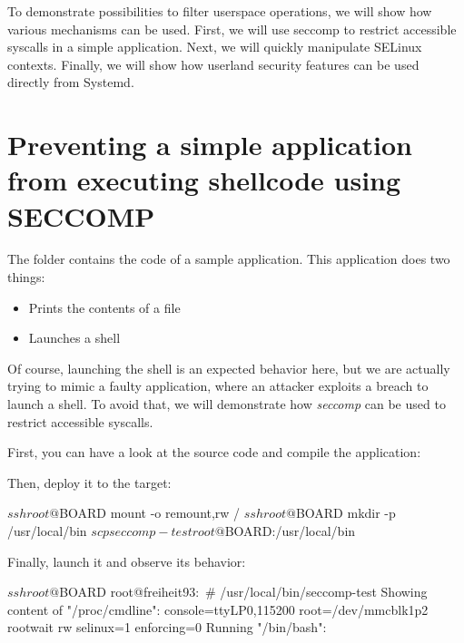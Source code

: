 
To demonstrate possibilities to filter userspace operations, we will show how
various mechanisms can be used. First, we will use seccomp to restrict
accessible syscalls in a simple application.
Next, we will quickly manipulate SELinux contexts.
Finally, we will show how userland security features can be used directly from
Systemd.

\section{Preventing a simple application from executing shellcode using SECCOMP}

The  folder contains the
code of a sample application. This application does two things:
\begin{itemize}
  \item Prints the contents of a file
  \item Launches a shell
\end{itemize}

Of course, launching the shell is an expected behavior here, but we are
actually trying to mimic a faulty application, where an attacker exploits a
breach to launch a shell.
To avoid that, we will demonstrate how \emph{seccomp} can be used to restrict
accessible syscalls.

First, you can have a look at the source code and compile the application:


Then, deploy it to the target:

\begin{bashinput}
$ ssh root@${BOARD} mount -o remount,rw /
$ ssh root@${BOARD} mkdir -p /usr/local/bin
$ scp seccomp-test root@${BOARD}:/usr/local/bin
\end{bashinput}

Finally, launch it and observe its behavior:

\begin{bashinput}
$ ssh root@${BOARD}
root@freiheit93:~# /usr/local/bin/seccomp-test
Showing content of "/proc/cmdline":
console=ttyLP0,115200 root=/dev/mmcblk1p2 rootwait rw selinux=1 enforcing=0
Running "/bin/bash":
\end{bashinput}


